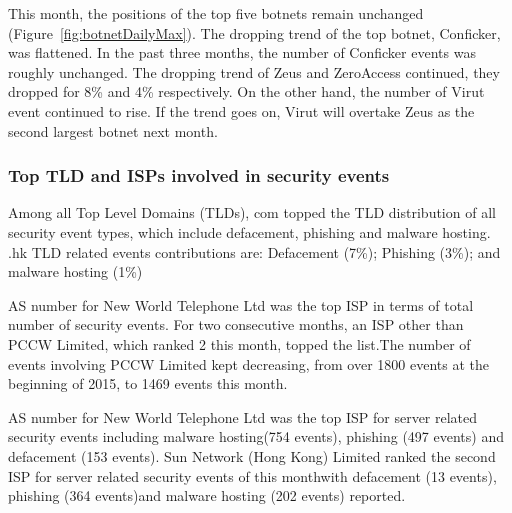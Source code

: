 \documentclass[__FONT_SIZE__]{extarticle}
\begin{document}
This month, the positions of the top five botnets remain unchanged (Figure~\ref{fig:botnetDailyMax}).
The dropping trend of the top botnet, Conficker, was flattened. In the past three months, the number of Conficker events was roughly unchanged.
The dropping trend of Zeus and ZeroAccess continued, they dropped for 8\% and 4\% respectively. On the other hand, the number of Virut event continued to rise. If the trend goes on, Virut will overtake Zeus as the second largest botnet next month.
\FloatBarrier
\subsubsection*{Top TLD and ISPs involved in security events}
Among all Top Level Domains (TLDs), com topped the TLD distribution of all security event types, which include defacement, phishing and malware hosting.
.hk TLD related events contributions are: Defacement (7\%); Phishing (3\%); and malware hosting (1\%)

AS number for New World Telephone Ltd was the top ISP in terms of total number of security events. For two consecutive months, an ISP other than PCCW Limited, which ranked 2 this month, topped the list.The number of events involving PCCW Limited kept decreasing, from over 1800 events at the beginning of 2015, to 1469 events this month.

AS number for New World Telephone Ltd was the top ISP for server related security events including malware hosting(754 events), phishing (497 events) and defacement (153 events).
Sun Network (Hong Kong) Limited ranked the second ISP for server related security events of this monthwith defacement (13 events), phishing (364 events)and malware hosting (202 events) reported.
\pagebreak
\FloatBarrier
\end{document}
